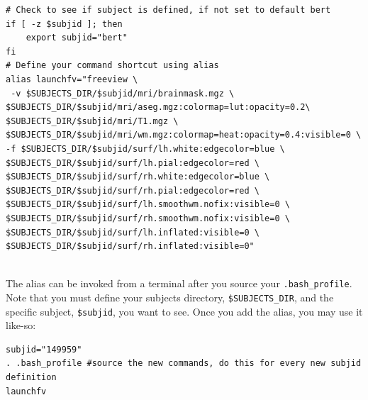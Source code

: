 \documentclass[paper=a4, fontsize=11pt]{scrartcl} %
\numberwithin{equation}{section} %
\numberwithin{figure}{section} %
\numberwithin{table}{section} %
\begin{document}
\begin{lstlisting}
# Check to see if subject is defined, if not set to default bert
if [ -z $subjid ]; then
	export subjid="bert"
fi
# Define your command shortcut using alias
alias launchfv="freeview \
 -v $SUBJECTS_DIR/$subjid/mri/brainmask.mgz \                                                                               
$SUBJECTS_DIR/$subjid/mri/aseg.mgz:colormap=lut:opacity=0.2\                                                                                        
$SUBJECTS_DIR/$subjid/mri/T1.mgz \                                                                                                                  
$SUBJECTS_DIR/$subjid/mri/wm.mgz:colormap=heat:opacity=0.4:visible=0 \                                                                              
-f $SUBJECTS_DIR/$subjid/surf/lh.white:edgecolor=blue \                                                                                             
$SUBJECTS_DIR/$subjid/surf/lh.pial:edgecolor=red \                                                                                                  
$SUBJECTS_DIR/$subjid/surf/rh.white:edgecolor=blue \                                                                                                
$SUBJECTS_DIR/$subjid/surf/rh.pial:edgecolor=red \                                                                                                  
$SUBJECTS_DIR/$subjid/surf/lh.smoothwm.nofix:visible=0 \                                                                                            
$SUBJECTS_DIR/$subjid/surf/rh.smoothwm.nofix:visible=0 \                                                                                            
$SUBJECTS_DIR/$subjid/surf/lh.inflated:visible=0 \                                                                                                  
$SUBJECTS_DIR/$subjid/surf/rh.inflated:visible=0"
\end{lstlisting}

~\\The alias can be invoked from a terminal after you source your \texttt{.bash\_profile}.  Note that you must define your subjects directory, \texttt{\$SUBJECTS\_DIR}, and the specific subject, \texttt{\$subjid}, you want to see. Once you add the alias, you may use it like-so:

\begin{lstlisting}
subjid="149959"
. .bash_profile #source the new commands, do this for every new subjid definition
launchfv
\end{lstlisting}
\end{document}
